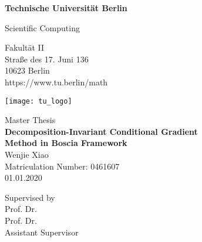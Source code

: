 \thispagestyle{empty}
\begin{center}

\vspace*{1.4cm}
{\LARGE \textbf{Technische Universität Berlin}}

\vspace{0.5cm}

{\large Scientific Computing\\[1mm]}

Fakultät II\\
Straße des 17. Juni 136\\
10623 Berlin\\
https://www.tu.berlin/math\\

\vspace*{1cm}

\texttt{[image: tu\_logo]}

\vspace*{1.0cm}

{\LARGE Master Thesis}\\

\vspace{1.0cm}
{\LARGE \textbf{Decomposition-Invariant Conditional Gradient}}\\
\vspace*{0.3cm}
{\LARGE \textbf{Method in Boscia Framework}}\\
\vspace*{1.0cm}
{\LARGE Wenjie Xiao}
\\
\vspace*{0.5cm}
Matriculation Number: 0461607\\
01.01.2020\\ %
\vspace*{1.0cm}

Supervised by\\
Prof. Dr. \\
Prof. Dr. \\

\vspace*{0.5cm}
Assistant Supervisor\\

\vspace{3cm}


\end{center}

